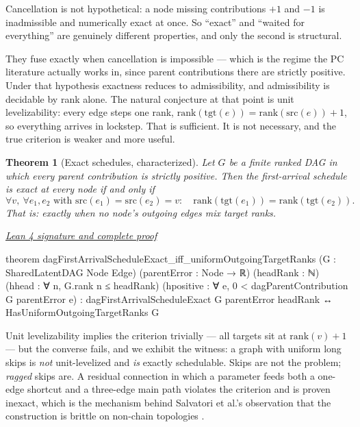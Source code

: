 \documentclass[11pt]{article}
\newtheorem{theorem}{Theorem}[section]
\newcommand{\leancommit}{f3a31db36bb2f944312ee31c1d86c2758109e83a}
\newcommand{\leansignaturelink}[2]{%
  \par\Needspace{0.3\textheight}\smallskip\noindent
  \href{https://github.com/zariuq/MeTTapedia/blob/\leancommit/#1\#L#2}{%
    \scriptsize\itshape Lean 4 signature and complete proof}\par\nobreak}
\begin{document}
Cancellation is not hypothetical: a node missing contributions $+1$ and $-1$ is
inadmissible and numerically exact at once. So ``exact'' and ``waited for everything''
are genuinely different properties, and only the second is structural.

They fuse exactly when cancellation is impossible --- which is the regime the PC
literature actually works in, since parent contributions there are strictly positive.
Under that hypothesis exactness reduces to admissibility, and admissibility is decidable
by rank alone. The natural conjecture at that point is unit levelizability: every edge
steps one rank, $\mathrm{rank}(\mathrm{tgt}(e)) = \mathrm{rank}(\mathrm{src}(e)) + 1$, so
everything arrives in lockstep. That is sufficient. It is not necessary, and the true
criterion is weaker and more useful.

\begin{theorem}[Exact schedules, characterized]\label{thm:sched}
Let $G$ be a finite ranked DAG in which every parent contribution is strictly positive.
Then the first-arrival schedule is exact at every node if and only if
\[
\forall v,\ \forall e_1, e_2 \text{ with } \mathrm{src}(e_1)=\mathrm{src}(e_2)=v:\quad
\mathrm{rank}(\mathrm{tgt}(e_1)) = \mathrm{rank}(\mathrm{tgt}(e_2)).
\]
That is: exactly when no node's outgoing edges mix target ranks.
\end{theorem}

\leansignaturelink{lean/mettapedia/Mettapedia/MachineLearning/NeuralNetworks/%
PredictiveCoding/DAGScheduleExactness.lean}{727}
\begin{leansignature}
theorem dagFirstArrivalScheduleExact_iff_uniformOutgoingTargetRanks
    (G : SharedLatentDAG Node Edge) (parentError : Node → ℝ)
    (headRank : ℕ) (hhead : ∀ n, G.rank n ≤ headRank)
    (hpositive : ∀ e, 0 < dagParentContribution G parentError e) :
    dagFirstArrivalScheduleExact G parentError headRank ↔
      HasUniformOutgoingTargetRanks G
\end{leansignature}

Unit levelizability implies the criterion trivially --- all targets sit at
$\mathrm{rank}(v)+1$ --- but the converse fails, and we exhibit the witness: a graph with
uniform long skips is \emph{not} unit-levelized and \emph{is} exactly schedulable. Skips
are not the problem; \emph{ragged} skips are. A residual connection in which a parameter
feeds both a one-edge shortcut and a three-edge main path violates the criterion and is
proven inexact, which is the mechanism behind Salvatori et al.'s observation that the
construction is brittle on non-chain topologies \cite{salvatori2022}.
\end{document}
